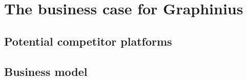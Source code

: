 \chapter{The business case for Graphinius}
\label{ch:business_case}


\section{Potential competitor platforms}
\label{sect:potential_competitors}


\section{Business model}
\label{sect:business_model}
